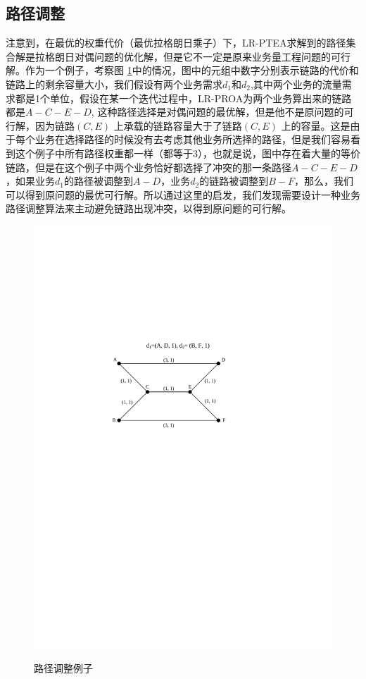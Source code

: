\subsection{路径调整}
注意到，在最优的权重代价（最优拉格朗日乘子）下，LR-PTEA求解到的路径集合解是拉格朗日对偶问题的优化解，但是它不一定是原来业务量工程问题的可行解。作为一个例子，考察图 \ref{ppt}中的情况，图中的元组中数字分别表示链路的代价和链路上的剩余容量大小，我们假设有两个业务需求$d_1$和$d_2$,其中两个业务的流量需求都是1个单位，假设在某一个迭代过程中，LR-PROA为两个业务算出来的链路都是$A-C-E-D$, 这种路径选择是对偶问题的最优解，但是他不是原问题的可行解，因为链路$(C,E)$ 上承载的链路容量大于了链路$(C,E)$ 上的容量。这是由于每个业务在选择路径的时候没有去考虑其他业务所选择的路径，但是我们容易看到这个例子中所有路径权重都一样（都等于3），也就是说，图中存在着大量的等价链路，但是在这个例子中两个业务恰好都选择了冲突的那一条路径$A-C-E-D$，如果业务$d_1$的路径被调整到$A-D$，业务$d_2$的链路被调整到$B-F$，那么，我们可以得到原问题的最优可行解。所以通过这里的启发，我们发现需要设计一种业务路径调整算法来主动避免链路出现冲突，以得到原问题的可行解。
\begin{figure}
\setlength{\abovecaptionskip}{-0.5cm}
\begin{center}
{\includegraphics[width=0.4 \textwidth]{figures/PathAdj.pdf}}
\end{center}
\caption{{\footnotesize{路径调整例子}}}
\label{ppt}
\end{figure}

